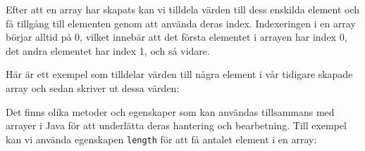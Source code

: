 \hypertarget{cb2}{}
\begin{Shaded}
\begin{Highlighting}[]
\OperatorTok{[]}\OperatorTok{=}  \OperatorTok{[}\OperatorTok{];}
\end{Highlighting}
\end{Shaded}

Efter att en array har skapats kan vi tilldela värden till dess enskilda
element och få tillgång till elementen genom att använda deras index.
Indexeringen i en array börjar alltid på 0, vilket innebär att det
första elementet i arrayen har index 0, det andra elementet har index 1,
och så vidare.

Här är ett exempel som tilldelar värden till några element i vår
tidigare skapade array och sedan skriver ut dessa värden:

\hypertarget{cb3}{}
\begin{Shaded}
\begin{Highlighting}[]
\OperatorTok{[}\OperatorTok{]} \OperatorTok{=} \OperatorTok{;}
\OperatorTok{[}\OperatorTok{]} \OperatorTok{=} \OperatorTok{;}
\OperatorTok{[}\OperatorTok{]} \OperatorTok{=} \OperatorTok{;}
\OperatorTok{[}\OperatorTok{]} \OperatorTok{=} \OperatorTok{;}
\OperatorTok{[}\OperatorTok{]} \OperatorTok{=} \OperatorTok{;}

\OperatorTok{(}\OperatorTok{[}\OperatorTok{]);}  
\OperatorTok{(}\OperatorTok{[}\OperatorTok{]);}  
\OperatorTok{(}\OperatorTok{[}\OperatorTok{]);}  
\end{Highlighting}
\end{Shaded}

Det finns olika metoder och egenskaper som kan användas tillsammans med
arrayer i Java för att underlätta deras hantering och bearbetning. Till
exempel kan vi använda egenskapen \texttt{length} för att få antalet
element i en array:

